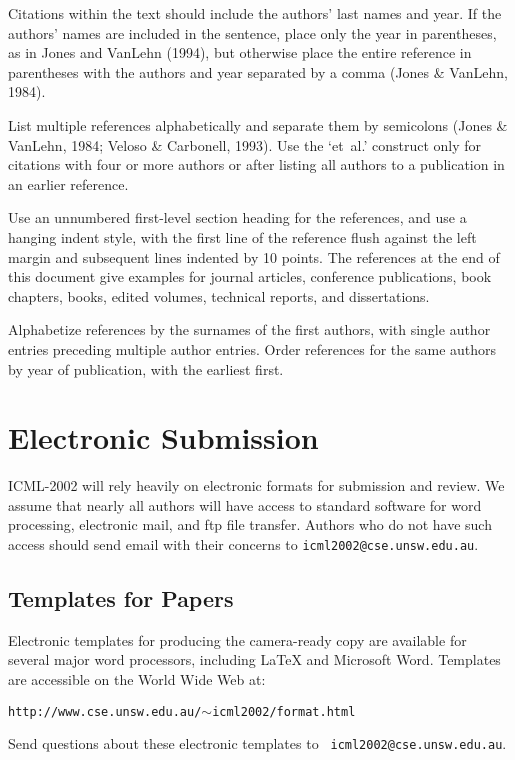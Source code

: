 Citations within the text should include the authors' last names and
year. If the authors' names are included in the sentence, place only
the year in parentheses, as in Jones and VanLehn (1994), but otherwise 
place the entire reference in parentheses with the authors and year
separated by a comma (Jones \& VanLehn, 1984). 

List multiple references alphabetically and separate them by semicolons 
(Jones \& VanLehn, 1984; Veloso \& Carbonell, 1993). Use the `et~al.'
construct only for citations with four or more authors or after listing 
all authors to a publication in an earlier reference.

Use an unnumbered first-level section heading for the references, and 
use a hanging indent style, with the first line of the reference flush
against the left margin and subsequent lines indented by 10 points. 
The references at the end of this document give examples for journal
articles, conference publications, book chapters, books, edited volumes, 
technical reports, and dissertations. 

Alphabetize references by the surnames of the first authors, with
single author entries preceding multiple author entries. Order
references for the same authors by year of publication, with the
earliest first.

\section{Electronic Submission}

ICML-2002 will rely heavily on electronic formats for submission and 
review. We assume that nearly all authors will have access to standard
software for word processing, electronic mail, and ftp file transfer. 
Authors who do not have such access should send email with their concerns 
to {\tt icml2002@cse.unsw.edu.au}. 

\subsection{Templates for Papers}

Electronic templates for producing the camera-ready copy are available
for several major word processors, including \LaTeX\/ and Microsoft Word. 
Templates are accessible on the World Wide Web at:
\vskip 0.1in
\begin{small}
\centerline{{\tt http://www.cse.unsw.edu.au/$\mathtt{\sim}$icml2002/format.html}}
\end{small}
\noindent
Send questions about these electronic templates to {\tt
icml2002@cse.unsw.edu.au}.

